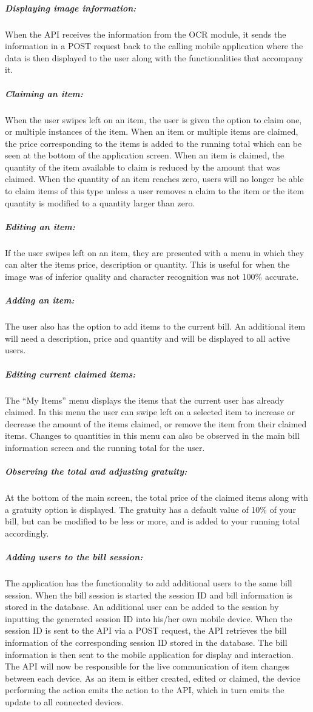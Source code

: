 \documentclass[12pt,a4paper]{article}
\begin{document}
\subparagraph{Displaying image information: }
When the API receives the information from the OCR module, it sends the information in a POST request back to the calling mobile application where the data is then displayed to the user along with the functionalities that accompany it. 
\subparagraph{Claiming an item: }
When the user swipes left on an item, the user is given the option to claim one, or multiple instances of the item. When an item or multiple items are claimed, the price corresponding to the items is added to the running total which can be seen at the bottom of the application screen. When an item is claimed, the quantity of the item available to claim is reduced by the amount that was claimed. When the quantity of an item reaches zero, users will no longer be able to claim items of this type unless a user removes a claim to the item or the item quantity is modified to a quantity larger than zero. 
\subparagraph{Editing an item: }
If the user swipes left on an item, they are presented with a menu in which they can alter the items price, description or quantity. This is useful for when the image was of inferior quality and character recognition was not 100\% accurate. 
\subparagraph{Adding an item: }
The user also has the option to add items to the current bill. An additional item will need a description, price and quantity and will be displayed to all active users. 
\subparagraph{Editing current claimed items: }
The “My Items” menu displays the items that the current user has already claimed. In this menu the user can swipe left on a selected item to increase or decrease the amount of the items claimed, or remove the item from their claimed items. Changes to quantities in this menu can also be observed in the main bill information screen and the running total for the user. 
\subparagraph{Observing the total and adjusting gratuity: }
At the bottom of the main screen, the total price of the claimed items along with a gratuity option is displayed. The gratuity has a default value of 10\% of your bill, but can be modified to be less or more, and is added to your running total accordingly.
\subparagraph{Adding users to the bill session: }
The application has the functionality to add additional users to the same bill session. When the bill session is started the session ID and bill information is stored in the database. An additional user can be added to the session by inputting the generated session ID into his/her own mobile device. When the session ID is sent to the API via a POST request, the API retrieves the bill information of the corresponding session ID stored in the database. The bill information is then sent to the mobile application for display and interaction. The API will now be responsible for the live communication of item changes between each device. As an item is either created, edited or claimed, the device performing the action emits the action to the API, which in turn emits the update to all connected devices.  
\end{document}
